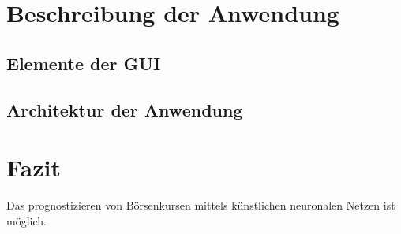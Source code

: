 \documentclass[a4paper,DIV11,bibliography=totoc,headings=normal,ngerman,headsepline,listof=totoc,parskip=half]{scrreprt}
\begin{document}
\chapter{Beschreibung der Anwendung} %
\section{Elemente der GUI} %
\section{Architektur der Anwendung} %

\chapter{Fazit} %
\label{cha:Fazit}
Das prognostizieren von Börsenkursen mittels künstlichen neuronalen Netzen ist möglich.


\end{document}
